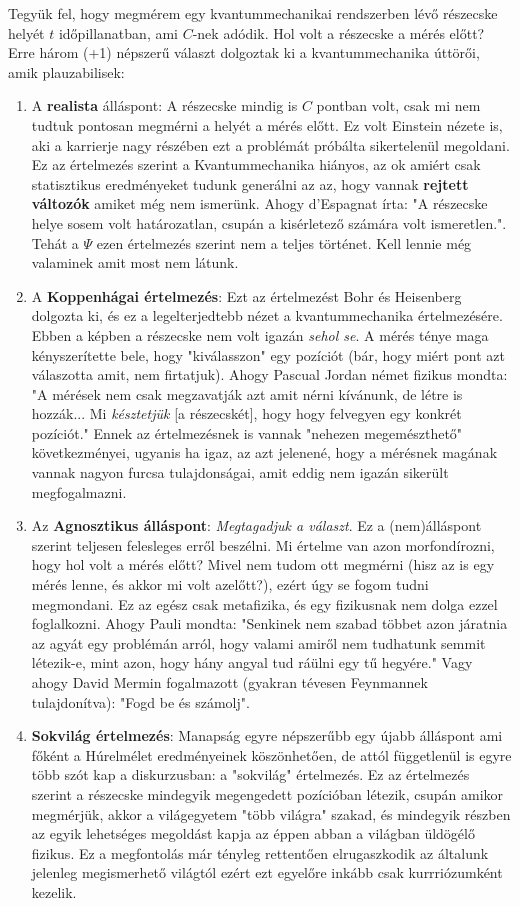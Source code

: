 \documentclass[../main.tex]{subfiles}
\begin{document}
Tegyük fel, hogy megmérem egy kvantummechanikai rendszerben lévő részecske helyét $t$ időpillanatban, ami $C$-nek adódik. Hol volt a részecske a mérés előtt? Erre három (+1) népszerű választ dolgoztak ki a kvantummechanika úttörői, amik
plauzabilisek:
\begin{enumerate}
    \item A \textbf{realista} álláspont: A részecske mindig is $C$ pontban volt, csak mi nem tudtuk pontosan megmérni a helyét a mérés előtt.
    Ez volt Einstein nézete is, aki a karrierje nagy részében ezt a problémát próbálta sikertelenül megoldani.
    Ez az értelmezés szerint a Kvantummechanika hiányos, az ok amiért csak statisztikus eredményeket tudunk generálni az az, hogy vannak \textbf{rejtett változók} amiket még nem ismerünk.
    Ahogy d'Espagnat írta: "A részecske helye sosem volt határozatlan, csupán a kisérletező számára volt ismeretlen.". Tehát a $\Psi$ ezen értelmezés szerint nem a teljes történet.
    Kell lennie még valaminek amit most nem látunk.
    \item A \textbf{Koppenhágai értelmezés}: Ezt az értelmezést Bohr és Heisenberg dolgozta ki, és ez a legelterjedtebb nézet a kvantummechanika értelmezésére. Ebben a képben a részecske nem volt igazán \textit{sehol se}.
    A mérés ténye maga kényszerítette bele, hogy "kiválasszon" egy pozíciót (bár, hogy miért pont azt válaszotta amit, nem firtatjuk). Ahogy Pascual Jordan német fizikus mondta:
    "A mérések nem csak megzavatják azt amit nérni kívánunk, de létre is hozzák... Mi \textit{késztetjük} [a részecskét], hogy hogy felvegyen egy konkrét pozíciót."
    Ennek az értelmezésnek is vannak "nehezen megemészthető" következményei, ugyanis ha igaz, az azt jelenené, hogy a mérésnek magának vannak nagyon furcsa tulajdonságai, amit eddig nem igazán sikerült megfogalmazni.
    \item Az \textbf{Agnosztikus álláspont}: \textit{Megtagadjuk a választ}. Ez a (nem)álláspont szerint teljesen felesleges erről beszélni. Mi értelme van azon morfondírozni, hogy hol volt a mérés előtt?
    Mivel nem tudom ott megmérni (hisz az is egy mérés lenne, és akkor mi volt azelőtt?), ezért úgy se fogom tudni megmondani. Ez az egész csak metafizika, és egy fizikusnak nem dolga ezzel foglalkozni. Ahogy 
    Pauli mondta: "Senkinek nem szabad többet azon járatnia az agyát egy problémán arról, hogy valami amiről nem tudhatunk semmit létezik-e, mint azon, hogy hány angyal tud ráülni egy tű hegyére." Vagy ahogy David Mermin fogalmazott (gyakran tévesen Feynmannek tulajdonítva): "Fogd be és számolj".
    \item \textbf{Sokvilág értelmezés}: Manapság egyre népszerűbb egy újabb álláspont ami főként a Húrelmélet eredményeinek köszönhetően, de attól függetlenül is egyre több szót kap a diskurzusban: a "sokvilág" értelmezés.
    Ez az értelmezés szerint a részecske mindegyik megengedett pozícióban létezik, csupán amikor megmérjük, akkor a világegyetem "több világra" szakad, és mindegyik részben az egyik lehetséges megoldást kapja az éppen abban
    a világban üldögélő fizikus. Ez a megfontolás már tényleg rettentően elrugaszkodik az általunk jelenleg megismerhető világtól ezért ezt egyelőre inkább csak kurrriózumként kezelik. 
\end{enumerate}
\end{document}

